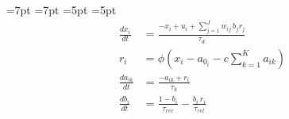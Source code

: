 \documentclass[border=10pt,preview]{standalone}
\begin{document}
\fontsize{36}{50}\selectfont
$ $%
=7pt   %
=7pt   %
=5pt %
=5pt
\begin{align*}
\frac{dx_i}{dt} &= \frac{-x_i + u_i + \sum_{j=1}^{J} w_{ij}\, b_j r_{j}}{\tau_d} \\[1.2ex]
r_i &= \phi\left( x_i - a_{0_i} - c \sum_{k=1}^{K} a_{ik} \right) \\[1.2ex]
\frac{da_{ik}}{dt} &= \frac{-a_{ik} + r_i}{\tau_{k}} \\[1.2ex]
\frac{db_i}{dt} &= \frac{1-b_i}{\tau_{rec}} - \frac{b_i\, r_i}{\tau_{rel}}
\end{align*}
\end{document}
